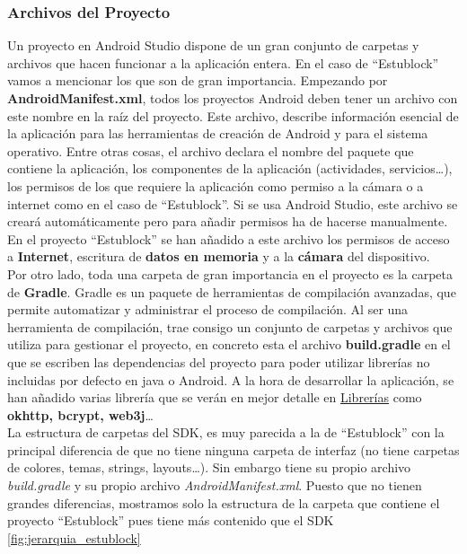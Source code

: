 \subsubsection{Archivos del Proyecto}


Un proyecto en Android Studio dispone de un gran conjunto de carpetas y archivos que hacen funcionar a la aplicación entera. En el caso de ``Estublock'' vamos a mencionar los que son de gran importancia. Empezando por \textbf{AndroidManifest.xml}, todos los proyectos Android deben tener un archivo con este nombre en la raíz del proyecto. Este archivo, describe información esencial de la aplicación para las herramientas de creación de Android y para el sistema operativo. Entre otras cosas, el archivo declara el nombre del paquete que contiene la aplicación, los componentes de la aplicación (actividades, servicios\dots), los permisos de los que requiere la aplicación como permiso a la cámara o a internet como en el caso de ``Estublock''. Si se usa Android Studio, este archivo se creará automáticamente pero para añadir permisos ha de hacerse manualmente. En el proyecto ``Estublock'' se han añadido a este archivo los permisos de acceso a \textbf{Internet}, escritura de \textbf{datos en memoria} y a la \textbf{cámara} del dispositivo. \\

Por otro lado, toda una carpeta de gran importancia en el proyecto es la carpeta de \textbf{Gradle}. Gradle es un paquete de herramientas de compilación avanzadas, que permite automatizar y administrar el proceso de compilación. Al ser una herramienta de compilación, trae consigo un conjunto de carpetas y archivos que utiliza para gestionar el proyecto, en concreto esta el archivo \textbf{build.gradle} en el que se escriben las dependencias del proyecto para poder utilizar librerías no incluidas por defecto en java o Android. A la hora de desarrollar la aplicación, se han añadido varias librería que se verán en mejor detalle en \hyperref[sec:librerias]{Librerías} como \textbf{okhttp, bcrypt, web3j}\dots \\

La estructura de carpetas del SDK, es muy parecida a la de ``Estublock'' con la principal diferencia de que no tiene ninguna carpeta de interfaz (no tiene carpetas de colores, temas, strings, layouts\dots). Sin embargo tiene su propio archivo \emph{build.gradle} y su propio archivo \emph{AndroidManifest.xml}. Puesto que no tienen grandes diferencias, mostramos solo la estructura de la carpeta que contiene el proyecto ``Estublock'' pues tiene más contenido que el SDK \ref{fig:jerarquia_estublock} \\

